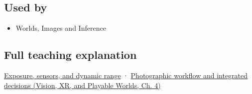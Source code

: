\subsection{Used by}\label{appendix-92d45cdf2afc-used-by}

\hypertarget{appendix-92d45cdf2afc-used-by}{}

\begin{itemize}
\tightlist
\item
  {Worlds, Images and Inference}
\end{itemize}

\subsection{Full teaching explanation}\label{appendix-92d45cdf2afc-full-teaching-explanation}

\hypertarget{appendix-92d45cdf2afc-full-teaching-explanation}{}

\hyperref[03-visual-computing-i-ch003-exposure-sensors-and-dynamic-range]{Exposure, sensors, and dynamic range} · \href{../07-Vision-XR-and-Playable-Worlds/main.pdf\#nameddest=04-visual-computing-ii-ch034-photographic-workflow-and-integrated-decisions}{Photographic workflow and integrated decisions (Vision, XR, and Playable Worlds, Ch. 4)}
